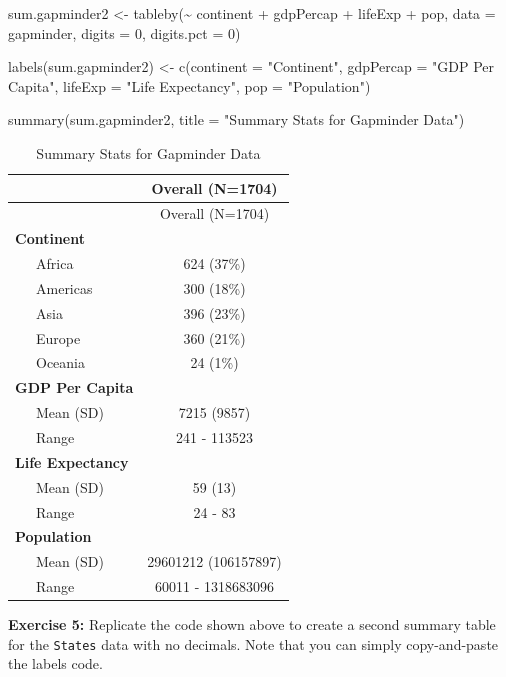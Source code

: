 \documentclass[
]{book}
\makeatletter
\newenvironment{Shaded}{\begin{snugshade}}{\end{snugshade}}
\newcommand{\AttributeTok}[1]{\textcolor[rgb]{0.61,0.61,0.61}{#1}}
\newcommand{\DecValTok}[1]{\textcolor[rgb]{0.06,0.06,0.06}{#1}}
\newcommand{\FunctionTok}[1]{\textcolor[rgb]{0,0,0}{#1}}
\newcommand{\NormalTok}[1]{#1}
\newcommand{\OtherTok}[1]{\textcolor[rgb]{0.37,0.37,0.37}{#1}}
\newcommand{\SpecialCharTok}[1]{\textcolor[rgb]{0,0,0}{#1}}
\newcommand{\StringTok}[1]{\textcolor[rgb]{0.5,0.5,0.5}{#1}}
\newenvironment{kframe}{%
\medskip{}
\setlength{\fboxsep}{.8em}
 \def\at@end@of@kframe{}%
 \ifinner\ifhmode%
  \def\at@end@of@kframe{\end{minipage}}%
  \begin{minipage}{\columnwidth}%
 \fi\fi%
 \def\FrameCommand##1{\hskip\@totalleftmargin \hskip-\fboxsep
 \colorbox{shadecolor}{##1}\hskip-\fboxsep
     \hskip-\linewidth \hskip-\@totalleftmargin \hskip\columnwidth}%
 \MakeFramed {\advance\hsize-\width
   \@totalleftmargin\z@ \linewidth\hsize
   \@setminipage}}%
 {\par\unskip\endMakeFramed%
 \at@end@of@kframe}
\renewenvironment{Shaded}{\begin{kframe}}{\end{kframe}}
\newenvironment{rmdblock}[1]
  {\begin{shaded*}
  }
  {\end{shaded*}
  }
\newenvironment{learncheck}
  {\begin{rmdblock}{warning}}
  {\end{rmdblock}}
\makeatother
\begin{document}
\begin{Shaded}
\begin{Highlighting}[]
\NormalTok{sum.gapminder2 }\OtherTok{\textless{}{-}} \FunctionTok{tableby}\NormalTok{(}\SpecialCharTok{\textasciitilde{}}\NormalTok{ continent }\SpecialCharTok{+}\NormalTok{ gdpPercap }\SpecialCharTok{+}\NormalTok{ lifeExp }\SpecialCharTok{+}\NormalTok{ pop, }\AttributeTok{data =}\NormalTok{ gapminder, }\AttributeTok{digits =} \DecValTok{0}\NormalTok{, }\AttributeTok{digits.pct =} \DecValTok{0}\NormalTok{)}

\FunctionTok{labels}\NormalTok{(sum.gapminder2) }\OtherTok{\textless{}{-}} \FunctionTok{c}\NormalTok{(}\AttributeTok{continent =} \StringTok{"Continent"}\NormalTok{, }\AttributeTok{gdpPercap =} \StringTok{"GDP Per Capita"}\NormalTok{, }\AttributeTok{lifeExp =} \StringTok{"Life Expectancy"}\NormalTok{, }\AttributeTok{pop =} \StringTok{"Population"}\NormalTok{)}
\end{Highlighting}
\end{Shaded}

\begin{Shaded}
\begin{Highlighting}[]
\FunctionTok{summary}\NormalTok{(sum.gapminder2, }\AttributeTok{title =} \StringTok{"Summary Stats for Gapminder Data"}\NormalTok{)}
\end{Highlighting}
\end{Shaded}

\begin{longtable}[]{@{}lc@{}}
\caption{Summary Stats for Gapminder Data}\tabularnewline
\toprule
& Overall (N=1704)\tabularnewline
\midrule
\endfirsthead
\toprule
& Overall (N=1704)\tabularnewline
\midrule
\endhead
\textbf{Continent} &\tabularnewline
~~~Africa & 624 (37\%)\tabularnewline
~~~Americas & 300 (18\%)\tabularnewline
~~~Asia & 396 (23\%)\tabularnewline
~~~Europe & 360 (21\%)\tabularnewline
~~~Oceania & 24 (1\%)\tabularnewline
\textbf{GDP Per Capita} &\tabularnewline
~~~Mean (SD) & 7215 (9857)\tabularnewline
~~~Range & 241 - 113523\tabularnewline
\textbf{Life Expectancy} &\tabularnewline
~~~Mean (SD) & 59 (13)\tabularnewline
~~~Range & 24 - 83\tabularnewline
\textbf{Population} &\tabularnewline
~~~Mean (SD) & 29601212 (106157897)\tabularnewline
~~~Range & 60011 - 1318683096\tabularnewline
\bottomrule
\end{longtable}

\begin{learncheck}
\textbf{Exercise 5:} Replicate the code shown above to create a second
summary table for the \texttt{States} data with no decimals. Note that
you can simply copy-and-paste the labels code.
\end{learncheck}
\end{document}
